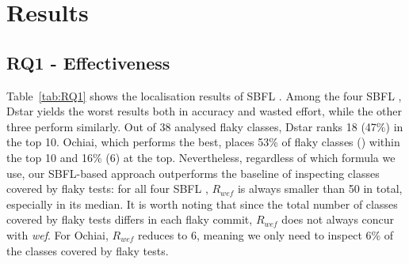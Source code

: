 \section{Results}
\label{sec:sherloc-results}


\subsection{RQ1 - Effectiveness}

Table~\ref{tab:RQ1} shows the localisation results of SBFL \formulas.
Among the four SBFL \formulas, Dstar yields the worst results both in accuracy and wasted effort, while the other three perform similarly. Out of 38 analysed flaky classes, Dstar ranks 18 (47\%) in the top 10. Ochiai, which performs the best, places 53\% of flaky classes () within the top 10 and 16\% (6) at the top. Nevertheless, regardless of which formula we use, our SBFL-based approach outperforms the baseline of inspecting classes covered by flaky tests: for all four SBFL \formulas, $R_{wef}$ is always smaller than 50 in total, 
especially in its median. It is worth noting that since the total number of classes covered by flaky tests differs in each flaky commit, $R_{wef}$ does not always concur with \textit{wef}. For Ochiai, $R_{wef}$ reduces to 6, meaning we only need to inspect 6\% of the classes covered by flaky tests.  

